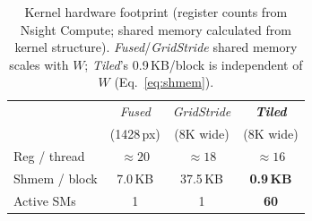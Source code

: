 \begin{table}[t]
\caption{Kernel hardware footprint (register counts from Nsight Compute;
shared memory calculated from kernel structure).
\emph{Fused}/\emph{GridStride} shared memory scales with $W$;
\emph{Tiled}'s 0.9\,KB/block is independent of $W$ (Eq.~\eqref{eq:shmem}).}
\label{tab:hw}
\centering
\begin{tabular}{@{}lccc@{}}
\toprule
 & \emph{Fused} & \emph{GridStride} & \textbf{\emph{Tiled}} \\
 & (1428\,px) & (8K wide) & (8K wide) \\
\midrule
Reg / thread   & ${\approx}20$ & ${\approx}18$ & ${\approx}16$ \\
Shmem / block  & 7.0\,KB       & 37.5\,KB      & \textbf{0.9\,KB} \\
Active SMs     & 1             & 1             & \textbf{60} \\
\bottomrule
\end{tabular}
\end{table}
